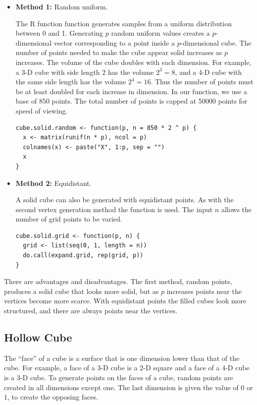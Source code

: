 \begin{itemize}

  \item {\bf Method 1:} Random uniform.

    The R function  function generates samples from a
    uniform distribution between 0 and 1. Generating $p$ random
    uniform values creates a $p$-dimensional vector corresponding to a
    point inside a $p$-dimensional cube. The number of points needed
    to make the cube appear solid increases as $p$ increases. The
    volume of the cube doubles with each dimension. For example, a 3-D
    cube with side length 2 has the volume $2^3=8$, and a 4-D cube
    with the same side length has the volume $2^4=16$. Thus the number
    of points must be at least doubled for each increase in
    dimension. In our function, we use a base of 850 points. The total
    number of points is capped at 50000 points for speed of viewing.

\begin{verbatim}
cube.solid.random <- function(p, n = 850 * 2 ^ p) {
  x <- matrix(runif(n * p), ncol = p)
  colnames(x) <- paste("X", 1:p, sep = "")
  x
}
\end{verbatim}

  \item {\bf Method 2:} Equidistant.

    A solid cube can also be generated with equidistant points. As
    with the second vertex generation method the 
    function is used. The input $n$ allows the number of grid points
    to be varied.

\begin{verbatim}
cube.solid.grid <- function(p, n) {
  grid <- list(seq(0, 1, length = n))
  do.call(expand.grid, rep(grid, p))
}
\end{verbatim}
\end{itemize}

There are advantages and disadvantages.  The first method, random
points, produces a solid cube that looks more solid, but as $p$
increases points near the vertices become more scarce.  With
equidistant points the filled cubes look more structured, and there
are always points near the vertices.

\subsection{Hollow Cube}

The ``face'' of a cube is a surface that is one dimension lower than
that of the cube.  For example, a face of a 3-D cube is a 2-D square
and a face of a 4-D cube is a 3-D cube. To generate points on the
faces of a cube, random points are created in all dimensions except
one. The last dimension is given the value of $0$ or $1$, to create
the opposing faces.


